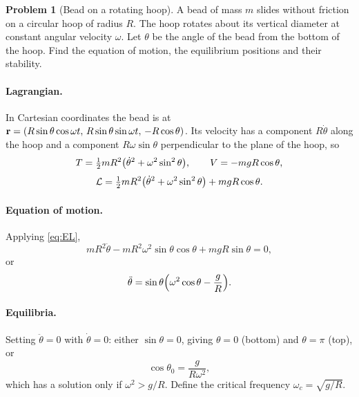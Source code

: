 \documentclass[11pt]{article}
\theoremstyle{definition}
\newtheorem{problem}{Problem}
\newcommand{\Lag}{\mathcal{L}}
\begin{document}
\begin{problem}[Bead on a rotating hoop]\label{prob:hoop}
A bead of mass $m$ slides without friction on a circular hoop of radius $R$. The hoop rotates about its vertical diameter at constant angular velocity $\omega$. Let $\theta$ be the angle of the bead from the bottom of the hoop. Find the equation of motion, the equilibrium positions and their stability.
\end{problem}

\paragraph{Lagrangian.} In Cartesian coordinates the bead is at $\vb{r} = (R\sin\theta\cos\omega t,\, R\sin\theta\sin\omega t,\, -R\cos\theta)$. Its velocity has a component $R\dot\theta$ along the hoop and a component $R\omega\sin\theta$ perpendicular to the plane of the hoop, so
\[
  T = \tfrac12 mR^2\qty(\dot\theta^2 + \omega^2\sin^2\theta), \qquad V = -mgR\cos\theta,
\]
\begin{equation}
  \Lag = \tfrac12 mR^2\qty(\dot\theta^2 + \omega^2\sin^2\theta) + mgR\cos\theta.
\end{equation}

\paragraph{Equation of motion.} Applying \eqref{eq:EL},
\[
  mR^2\ddot\theta - mR^2\omega^2\sin\theta\cos\theta + mgR\sin\theta = 0,
\]
or
\begin{equation}
  \ddot\theta = \sin\theta\qty(\omega^2\cos\theta - \frac{g}{R}).
  \label{eq:hoop-eom}
\end{equation}

\paragraph{Equilibria.} Setting $\ddot\theta = 0$ with $\dot\theta = 0$: either $\sin\theta = 0$, giving $\theta = 0$ (bottom) and $\theta = \pi$ (top), or
\[
  \cos\theta_0 = \frac{g}{R\omega^2},
\]
which has a solution only if $\omega^2 > g/R$. Define the critical frequency $\omega_c = \sqrt{g/R}$.
\end{document}

